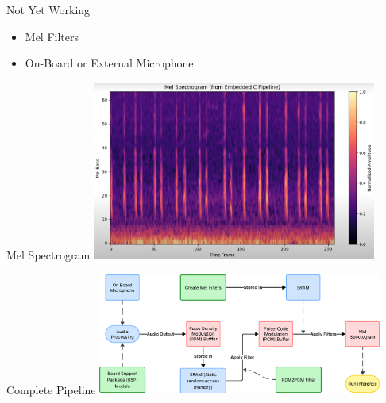 \begin{frame}{Not Yet Working}
    \begin{itemize}
        \item Mel Filters
        \item On-Board or External Microphone
    \end{itemize}    
\end{frame}

\begin{frame}{Mel Spectrogram}
    \centering
    \includegraphics[height=0.7\textheight,width=0.7\textwidth,keepaspectratio]{mel_spectogram.png}
    \caption{Mel Spectrogram of a Sample Audio}
\end{frame}

\begin{frame}{Complete Pipeline}
    \centering
    \includegraphics[height=0.7\textheight,width=0.7\textwidth,keepaspectratio]{pipeline.png}
\end{frame}

